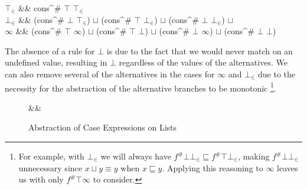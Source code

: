 \begin{haskell}
    \(\top_{\in}\) &\to& cons^{\#} \(\top\) \(\top_{\in}\)              \\  
    \(\bot_{\in}\) &\to& (cons^{\#} \(\bot\) \(\top_{\in}\)) \(\sqcup\)
                         (cons^{\#} \(\top\) \(\bot_{\in}\)) \(\sqcup\)
                         (cons^{\#} \(\bot\) \(\bot_{\in}\)) \(\sqcup\) \\  
    \(\infty\)     &\to& (cons^{\#} \(\top\) \(\infty\))     \(\sqcup\)
                         (cons^{\#} \(\top\) \(\bot\))       \(\sqcup\)
                         (cons^{\#} \(\bot\) \(\infty\))      \(\sqcup\)
                         (cons^{\#} \(\bot\) \(\bot\))
\end{haskell}

The absence of a rule for $\bot$ is due to the fact that we would never match
on an undefined value, resulting in $\bot$ regardless of the values of the
alternatives. We can also remove several of the alternatives in the cases for
$\infty$ and $\bot_{\in}$ due to the necessity for the abstraction of the
alternative branches to be monotonic \citep{wadler1987strictness}\footnote{For
example, with \(\bot_{\in}\) we will always have \(f^{\#} \bot \bot_{\in}
\sqsubseteq f^{\#} \top \bot_{\in}\), making \(f^{\#} \bot \bot_{\in}\)
unnecessary since \(x \sqcup y \equiv y\) when \(x \sqsubseteq y\). Applying
this reasoning to \(\infty\) leaves us with only \(f^{\#} \top \infty\) to
consider.}.

\begin{figure}[t!]
\begin{haskell*}
 \hasphi && \\
 
\end{haskell*}
\caption{Abstraction of Case Expressions on Lists}
\label{fig:absCase}
\end{figure}


